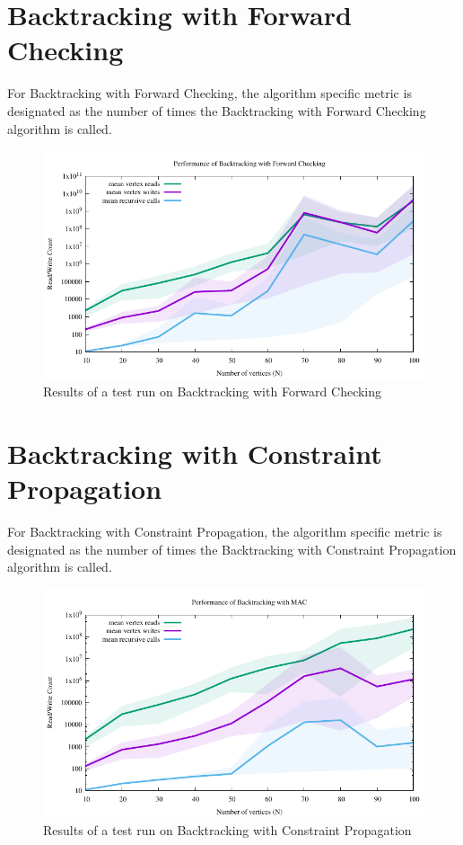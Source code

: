 \documentclass{article}
\begin{document}
\begin{multicols}{2}
\section{Backtracking with Forward Checking}
For Backtracking with Forward Checking, the algorithm specific metric is designated as the number of times the Backtracking with Forward Checking algorithm is called.
\begin{figure}[H]
	\centering
	\includegraphics[width=\linewidth]{../results/backtracking_forward/bt_forward_performance}
	\caption{Results of a test run on Backtracking with Forward Checking}
\end{figure}

\section{Backtracking with Constraint Propagation}
For Backtracking with Constraint Propagation, the algorithm specific metric is designated as the number of times the Backtracking with Constraint Propagation algorithm is called.
\begin{figure}[H]
	\centering
	\includegraphics[width=\linewidth]{../results/backtracking_mac/bt_mac_performance}
	\caption{Results of a test run on Backtracking with Constraint Propagation}


\end{figure}
\end{multicols}
\end{document}

